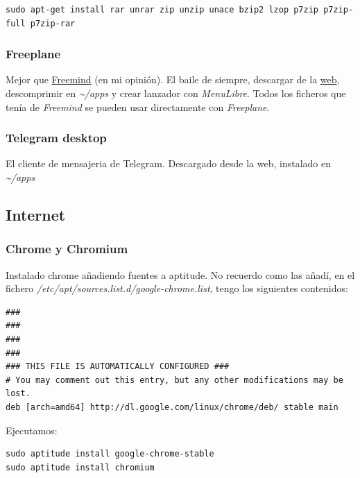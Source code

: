 \documentclass[12pt,spanish,]{article}
\begin{document}
\begin{verbatim}
sudo apt-get install rar unrar zip unzip unace bzip2 lzop p7zip p7zip-full p7zip-rar
\end{verbatim}

\subsubsection{Freeplane}\label{freeplane}

Mejor que
\href{http://freemind.sourceforge.net/wiki/index.php/Main_Page}{Freemind}
(en mi opinión). El baile de siempre, descargar de la
\href{http://www.freeplane.org/}{web}, descomprimir en
\emph{\textasciitilde{}/apps} y crear lanzador con \emph{MenuLibre}.
Todos los ficheros que tenía de \emph{Freemind} se pueden usar
directamente con \emph{Freeplane}.

\subsubsection{Telegram desktop}\label{telegram-desktop}

El cliente de mensajeria de Telegram. Descargado desde la web, instalado
en \emph{\textasciitilde{}/apps}

\subsection{Internet}\label{internet}

\subsubsection{Chrome y Chromium}\label{chrome-y-chromium}

Instalado chrome añadiendo fuentes a aptitude. No recuerdo como las
añadí, en el fichero \emph{/etc/apt/sources.list.d/google-chrome.list},
tengo los siguientes contenidos:

\begin{verbatim}
###
###
###
###
### THIS FILE IS AUTOMATICALLY CONFIGURED ###
# You may comment out this entry, but any other modifications may be lost.
deb [arch=amd64] http://dl.google.com/linux/chrome/deb/ stable main
\end{verbatim}

Ejecutamos:

\begin{verbatim}
sudo aptitude install google-chrome-stable
sudo aptitude install chromium
\end{verbatim}
\end{document}
